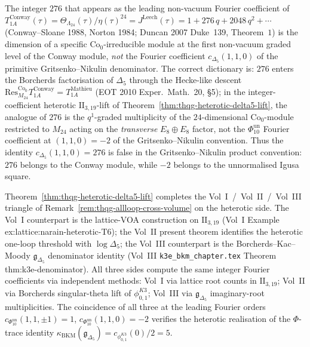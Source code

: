 \begin{remark}
\label{rem:thqg-heterotic-276-conway-not-delta5}
The integer $276$ that appears as the leading non-vacuum Fourier
coefficient of $T_{1A}^{\mathrm{Conway}}(\tau)
= \Theta_{\Lambda_{24}}(\tau)/\eta(\tau)^{24}
= J^{\mathrm{Leech}}(\tau) = 1 + 276\,q + 2048\,q^2 + \cdots$
\textup{(}Conway--Sloane 1988, Norton 1984; Duncan 2007
\textup{Duke}~139, Theorem~$1$\textup{)} is the dimension of a specific
$\mathrm{Co}_0$-irreducible module at the first non-vacuum graded
level of the Conway module, \emph{not} the Fourier coefficient
$c_{\Delta_5}(1, 1, 0)$ of the primitive Gritsenko--Nikulin
denominator. The correct
dictionary is: $276$ enters the Borcherds factorisation of $\Delta_5$
through the Hecke-like descent
$\mathrm{Res}^{\mathrm{Co}_0}_{M_{24}}T_{1A}^{\mathrm{Conway}}
= T_{1A}^{\mathrm{Mathieu}}$ \textup{(}EOT 2010
\textup{Exper.~Math.}~20, \S 5\textup{)}; in the integer-coefficient
heterotic $\mathrm{II}_{3,19}$-lift of
Theorem~\ref{thm:thqg-heterotic-delta5-lift}, the analogue of $276$
is the $q^1$-graded multiplicity of the $24$-dimensional
$\mathrm{Co}_0$-module restricted to $M_{24}$ acting on the
\emph{transverse} $E_8\oplus E_8$ factor, not the $\Phi_{10}^{\mathrm{un}}$
Fourier coefficient at $(1, 1, 0) = -2$ of the Gritsenko--Nikulin
convention. Thus the identity
$c_{\Delta_5}(1, 1, 0) = 276$ is false in the Gritsenko--Nikulin
product convention:
$276$ belongs to the Conway module, while $-2$ belongs to the
unnormalised Igusa square.
\end{remark}

\begin{remark}
\label{rem:thqg-heterotic-cross-volume-triangle}
Theorem~\ref{thm:thqg-heterotic-delta5-lift} completes the
Vol~I~/~Vol~II~/~Vol~III triangle of
Remark~\ref{rem:thqg-allloop-cross-volume} on the heterotic side.
The Vol~I counterpart is the lattice-VOA construction on
$\mathrm{II}_{3,19}$ \textup{(}Vol~I Example
\textup{ex:lattice:narain-heterotic-T6)}; the Vol~II present theorem
identifies the heterotic one-loop threshold with $\log\Delta_5$; the
Vol~III counterpart is the Borcherds--Kac--Moody
$\mathfrak{g}_{\Delta_5}$ denominator identity \textup{(}Vol~III
\texttt{k3e\_bkm\_chapter.tex} Theorem
\textup{thm:k3e-denominator)}. All three sides compute the same
integer Fourier coefficients via independent methods:
Vol~I via lattice root counts in $\mathrm{II}_{3,19}$;
Vol~II via Borcherds singular-theta lift of $\phi_{0,1}^{K3}$;
Vol~III via $\mathfrak{g}_{\Delta_5}$ imaginary-root multiplicities.
The coincidence of all three at the leading Fourier orders
$c_{\Phi_{10}^{\mathrm{un}}}(1, 1, \pm 1) = 1$,
$c_{\Phi_{10}^{\mathrm{un}}}(1, 1, 0) = -2$
verifies the heterotic realisation of the $\Phi$-trace
identity
$\kappa_{\mathrm{BKM}}(\mathfrak{g}_{\Delta_5})
=c_{\phi_{0,1}^{K3}}(0)/2=5$.
\end{remark}
